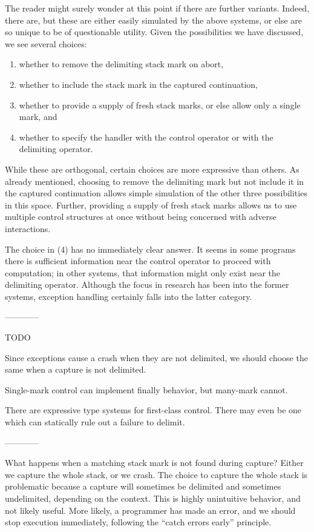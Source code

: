 \documentclass[11pt]{article}
\begin{document}
The reader might surely wonder at this point if there are further variants.
Indeed, there are, but these are either easily simulated by the above systems, or else are so unique to be of questionable utility.
Given the possibilities we have discussed, we see several choices:
\begin{enumerate}
\item whether to remove the delimiting stack mark on abort,
\item whether to include the stack mark in the captured continuation,
\item whether to provide a supply of fresh stack marks, or else allow only a single mark, and
\item whether to specify the handler with the control operator or with the delimiting operator.
\end{enumerate}
While these are orthogonal, certain choices are more expressive than others.
As already mentioned, choosing to remove the delimiting mark but not include it in the captured continuation allows simple simulation of the other three possibilities in this space.
Further, providing a supply of fresh stack marks allows us to use multiple control structures at once without being concerned with adverse interactions.

The choice in (4) has no immediately clear answer.
It seems in some programs there is sufficient information near the control operator to proceed with computation; in other systems, that information might only exist near the delimiting operator.
Although the focus in research has been into the former systems, exception handling certainly falls into the latter category.




------------

TODO

Since exceptions cause a crash when they are not delimited, we should choose the same when a capture is not delimited.

Single-mark control can implement finally behavior, but many-mark cannot.

There are expressive type systems for first-class control.
There may even be one which can statically rule out a failure to delimit.

------------

What happens when a matching stack mark is not found during capture?
Either we capture the whole stack, or we crash.
The choice to capture the whole stack is problematic because a capture will sometimes be delimited and sometimes undelimited, depending on the context.
This is highly unintuitive behavior, and not likely useful.
More likely, a programmer has made an error, and we should stop execution immediately, following the ``catch errors early'' principle.
\end{document}
